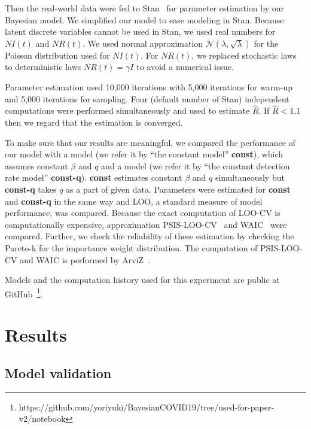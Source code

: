 \documentclass{amsart}
\begin{document}
Then the real-world data were fed to Stan~\cite{carpenter2017stan} for parameter estimation by our Bayesian model.
We simplified our model to ease modeling in Stan.
Because latent discrete variables cannot be used in Stan, we used real numbers for $NI(t)$ and $NR(t)$.
We used normal approximation $\mathcal{N}(\lambda, \sqrt{\lambda})$ for the Poisson distribution used for $NI(t)$.
For $NR(t)$, we replaced stochastic laws to deterministic laws $NR(t) = \gamma I$ to avoid a numerical issue.

Parameter estimation used 10,000 iterations with 5,000 iterations for warm-up and 5,000 iterations for sampling.
Four (default number of Stan) independent computations were performed simultaneously and used to estimate $\hat{R}$.
If $\hat{R} < 1.1$ then we regard that the estimation is converged.

To make sure that our results are meaningful, we compared the performance of our model with a model (we refer it by ``the constant model'' \textbf{const}), which assumes constant $\beta$ and $q$ and a model (we refer it by ``the constant detection rate model'' \textbf{const-q}).
\textbf{const} estimates constant $\beta$ and $q$ simultaneously but \textbf{const-q} takes $q$ as a part of given data.
Parameters were estimated for \textbf{const} and \textbf{const-q} in the same way and LOO, a standard measure of model performance, was compared.
Because the exact computation of LOO-CV is computationally expensive, approximation PSIS-LOO-CV~\cite{Vehtari2017} and WAIC~\cite{watanabe2010asymptotic} were compared.
Further, we check the reliability of these estimation by checking the Pareto-k for the importance weight distribution.
The computation of PSIS-LOO-CV and WAIC is performed by ArviZ~\cite{arviz2019}.

Models and the computation history used for this experiment are public at GitHub~\footnote{https://github.com/yoriyuki/BayesianCOVID19/tree/used-for-paper-v2/notebook}.

\section{Results}

\subsection{Model validation}\label{sec:validation}
\end{document}
